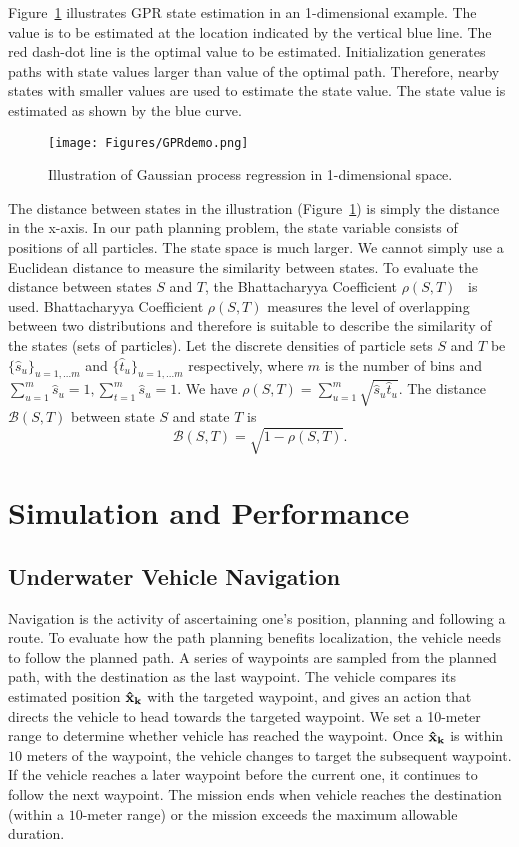 Figure~\ref{fig:GPRdemo} illustrates GPR state estimation in an 1-dimensional example. The value is to be estimated at the location indicated by the vertical blue line. The red dash-dot line is the optimal value to be estimated. Initialization generates paths with state values larger than value of the optimal path. Therefore, nearby states with smaller values are used to estimate the state value. The state value is estimated as shown by the blue curve.

\begin{figure}[htbp]
\centering
\texttt{[image: Figures/GPRdemo.png]}
\caption{Illustration of Gaussian process regression in 1-dimensional space.}
\label{fig:GPRdemo}
\end{figure}

The distance between states in the illustration (Figure~\ref{fig:GPRdemo}) is simply the distance in the x-axis. In our path planning problem, the state variable consists of positions of all particles. The state space is much larger. We cannot simply use a Euclidean distance to measure the similarity between states. To evaluate the distance between states $S$ and $T$, the Bhattacharyya Coefficient $\rho(S,T)$~\cite{Comaniciu2000} is used. Bhattacharyya Coefficient $\rho(S,T)$ measures the level of overlapping between two distributions and therefore is suitable to describe the similarity of the states (sets of particles). Let the discrete densities of particle sets $S$ and $T$ be $\{\hat{s}_u\}_{u=1,...m}$ and $\{\hat{t}_u\}_{u=1,...m}$ respectively, where $m$ is the number of bins and $\sum_{u=1}^m\hat{s}_u=1,\sum_{t=1}^m\hat{s}_u=1$. We have $\rho(S,T)=\sum_{u=1}^m\sqrt{\hat{s}_u\hat{t}_u}$. The distance $\mathcal{B}(S,T)$ between state $S$ and state $T$ is
\begin{equation}
\mathcal{B}(S,T)=\sqrt{1-\rho(S,T)}.
\end{equation}

\section{Simulation and Performance}
\label{sec:simulation}

\subsection{Underwater Vehicle Navigation}
Navigation is the activity of ascertaining one's position, planning and following a route. To evaluate how the path planning benefits localization, the vehicle needs to follow the planned path. A series of waypoints are sampled from the planned path, with the destination as the last waypoint. The vehicle compares its estimated position $\bf{\hat x}_k$ with the targeted waypoint, and gives an action that directs the vehicle to head towards the targeted waypoint. We set a 10-meter range to determine whether vehicle has reached the waypoint. Once $\bf{\hat x}_k$ is within $10$ meters of the waypoint, the vehicle changes to target the subsequent waypoint. If the vehicle reaches a later waypoint before the current one, it continues to follow the next waypoint. The mission ends when vehicle reaches the destination (within a $10$-meter range) or the mission exceeds the maximum allowable duration.

